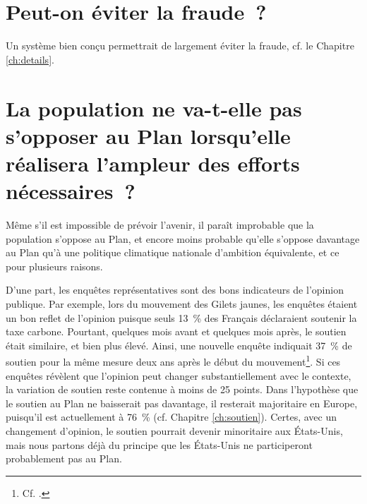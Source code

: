 \documentclass[a5paper,french]{memoir}
\begin{document}
\section*{\normalsize Peut-on éviter la fraude~?}\label{q:fraude}

Un système bien conçu permettrait de largement éviter la fraude, cf. le Chapitre \ref{ch:details}.

\section*{\normalsize La population ne va-t-elle pas s'opposer au Plan lorsqu'elle réalisera l'ampleur des efforts nécessaires~?}\label{q:soutien}

Même s'il est impossible de prévoir l'avenir, il paraît improbable que la population s'oppose au Plan, et encore moins probable %
qu'elle s'oppose davantage au Plan qu'à une politique climatique nationale d'ambition équivalente, et ce pour plusieurs raisons. 

D'une part, les enquêtes représentatives sont des bons indicateurs de l'opinion publique. Par exemple, lors du mouvement des Gilets jaunes, les enquêtes étaient un bon reflet de l'opinion puisque seuls 13~\% des Français déclaraient soutenir la taxe carbone. Pourtant, quelques mois avant et quelques mois après, le soutien était similaire, et bien plus élevé. Ainsi, une nouvelle enquête indiquait 37~\% de soutien pour la même mesure deux ans après le début du mouvement\footnote{Cf. \cite{douenne_les_2020}.}. Si ces enquêtes révèlent que l'opinion peut changer substantiellement avec le contexte, la variation de soutien reste contenue à moins de 25 points. Dans l'hypothèse que le soutien au Plan ne baisserait pas davantage, il resterait majoritaire en Europe, puisqu'il est actuellement à 76~\% (cf. Chapitre \ref{ch:soutien}). Certes, avec un changement d'opinion, le soutien pourrait devenir minoritaire aux États-Unis, mais nous partons déjà du principe que les États-Unis ne participeront probablement pas au Plan. 
\end{document}

